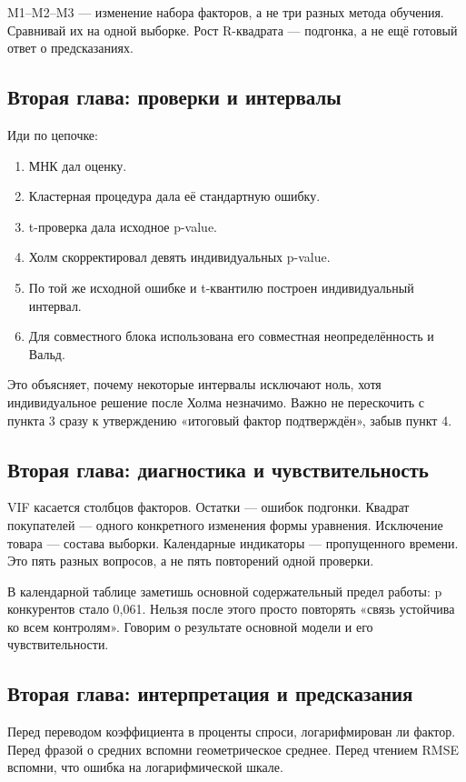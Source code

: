 \documentclass[12pt,a4paper]{article}
\begin{document}
M1--M2--M3 --- изменение набора факторов, а не три разных метода обучения. Сравнивай их на одной выборке. Рост R-квадрата --- подгонка, а не ещё готовый ответ о предсказаниях.

\subsection*{Вторая глава: проверки и интервалы}

Иди по цепочке:
\begin{enumerate}
\item МНК дал оценку.
\item Кластерная процедура дала её стандартную ошибку.
\item t-проверка дала исходное p-value.
\item Холм скорректировал девять индивидуальных p-value.
\item По той же исходной ошибке и t-квантилю построен индивидуальный интервал.
\item Для совместного блока использована его совместная неопределённость и Вальд.
\end{enumerate}

Это объясняет, почему некоторые интервалы исключают ноль, хотя индивидуальное решение после Холма незначимо. Важно не перескочить с пункта 3 сразу к утверждению «итоговый фактор подтверждён», забыв пункт 4.

\subsection*{Вторая глава: диагностика и чувствительность}

VIF касается столбцов факторов. Остатки --- ошибок подгонки. Квадрат покупателей --- одного конкретного изменения формы уравнения. Исключение товара --- состава выборки. Календарные индикаторы --- пропущенного времени. Это пять разных вопросов, а не пять повторений одной проверки.

В календарной таблице заметишь основной содержательный предел работы: p конкурентов стало 0,061. Нельзя после этого просто повторять «связь устойчива ко всем контролям». Говорим о результате основной модели и его чувствительности.

\subsection*{Вторая глава: интерпретация и предсказания}

Перед переводом коэффициента в проценты спроси, логарифмирован ли фактор. Перед фразой о средних вспомни геометрическое среднее. Перед чтением RMSE вспомни, что ошибка на логарифмической шкале.
\end{document}

